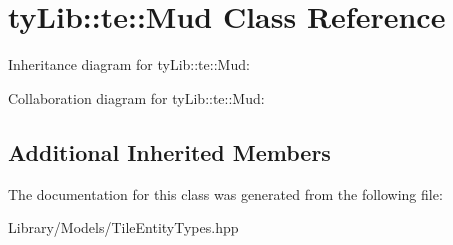 \hypertarget{classty_lib_1_1te_1_1_mud}{}\section{ty\+Lib\+:\+:te\+:\+:Mud Class Reference}
\label{classty_lib_1_1te_1_1_mud}


Inheritance diagram for ty\+Lib\+:\+:te\+:\+:Mud\+:


Collaboration diagram for ty\+Lib\+:\+:te\+:\+:Mud\+:
\subsection*{Additional Inherited Members}


The documentation for this class was generated from the following file\+:\begin{DoxyCompactItemize}
\item 
Library/\+Models/Tile\+Entity\+Types.\+hpp\end{DoxyCompactItemize}
